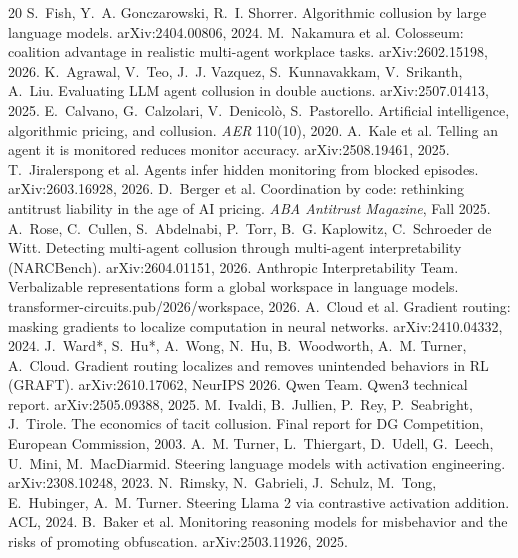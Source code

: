 \documentclass[10pt]{article}
\begin{document}

\begin{thebibliography}{20}
 S.~Fish, Y.~A. Gonczarowski, R.~I. Shorrer. Algorithmic collusion by large language models. arXiv:2404.00806, 2024.
 M.~Nakamura et al. Colosseum: coalition advantage in realistic multi-agent workplace tasks. arXiv:2602.15198, 2026.
 K.~Agrawal, V.~Teo, J.~J. Vazquez, S.~Kunnavakkam, V.~Srikanth, A.~Liu. Evaluating LLM agent collusion in double auctions. arXiv:2507.01413, 2025.
 E.~Calvano, G.~Calzolari, V.~Denicol\`o, S.~Pastorello. Artificial intelligence, algorithmic pricing, and collusion. \emph{AER} 110(10), 2020.
 A.~Kale et al. Telling an agent it is monitored reduces monitor accuracy. arXiv:2508.19461, 2025.
 T.~Jiralerspong et al. Agents infer hidden monitoring from blocked episodes. arXiv:2603.16928, 2026.
 D.~Berger et al. Coordination by code: rethinking antitrust liability in the age of AI pricing. \emph{ABA Antitrust Magazine}, Fall 2025.
 A.~Rose, C.~Cullen, S.~Abdelnabi, P.~Torr, B.~G. Kaplowitz, C.~Schroeder de Witt. Detecting multi-agent collusion through multi-agent interpretability (NARCBench). arXiv:2604.01151, 2026.
 Anthropic Interpretability Team. Verbalizable representations form a global workspace in language models. transformer-circuits.pub/2026/workspace, 2026.
 A.~Cloud et al. Gradient routing: masking gradients to localize computation in neural networks. arXiv:2410.04332, 2024.
 J.~Ward*, S.~Hu*, A.~Wong, N.~Hu, B.~Woodworth, A.~M. Turner, A.~Cloud. Gradient routing localizes and removes unintended behaviors in RL (GRAFT). arXiv:2610.17062, NeurIPS 2026.
 Qwen Team. Qwen3 technical report. arXiv:2505.09388, 2025.
 M.~Ivaldi, B.~Jullien, P.~Rey, P.~Seabright, J.~Tirole. The economics of tacit collusion. Final report for DG Competition, European Commission, 2003.
 A.~M. Turner, L.~Thiergart, D.~Udell, G.~Leech, U.~Mini, M.~MacDiarmid. Steering language models with activation engineering. arXiv:2308.10248, 2023.
 N.~Rimsky, N.~Gabrieli, J.~Schulz, M.~Tong, E.~Hubinger, A.~M. Turner. Steering Llama 2 via contrastive activation addition. ACL, 2024.
 B.~Baker et al. Monitoring reasoning models for misbehavior and the risks of promoting obfuscation. arXiv:2503.11926, 2025.
\end{thebibliography}
\end{document}
